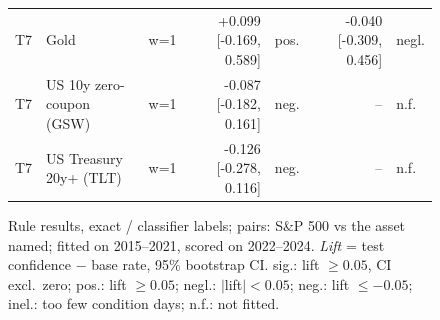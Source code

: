 \begin{figure}[t]
{\begin{tabular}{lllrlrl}
T7 & Gold & w=1 & +0.099 [-0.169, 0.589] & pos. & -0.040 [-0.309, 0.456] & negl. \\
T7 & US 10y zero-coupon (GSW) & w=1 & -0.087 [-0.182, 0.161] & neg. & -- & n.f. \\
T7 & US Treasury 20y+ (TLT) & w=1 & -0.126 [-0.278, 0.116] & neg. & -- & n.f. \\
\bottomrule
\end{tabular}
}
\caption{\small{Rule results, exact / classifier labels; pairs: S\&P 500 vs the asset named; fitted on 2015--2021, scored on 2022--2024. \emph{Lift} = test confidence $-$ base rate, 95\% bootstrap CI. sig.: lift $\geq 0.05$, CI excl.\ zero; pos.: lift $\geq 0.05$; negl.: $|$lift$| < 0.05$; neg.: lift $\leq -0.05$; inel.: too few condition days; n.f.: not fitted.}}
\label{fig:rule-results-combined}
\end{figure}
